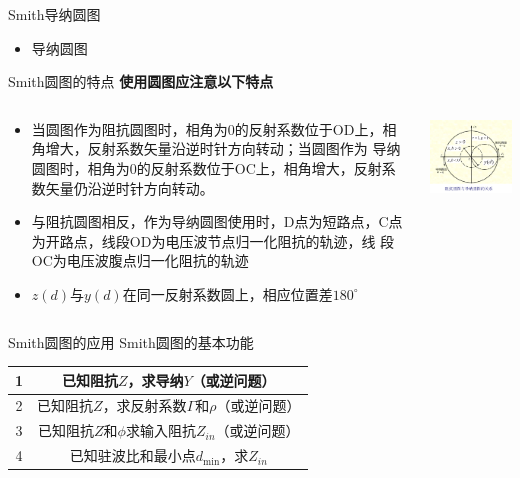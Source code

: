 \begin{frame}{Smith导纳圆图}
  \begin{itemize}
    \item 导纳圆图
  \end{itemize}
\end{frame}

\begin{frame}{Smith圆图的特点}
  \textbf{使用圆图应注意以下特点}\\
  \begin{columns}
    \begin{column}{0.4\linewidth}
      \begin{itemize}
        \item \footnotesize{当圆图作为阻抗圆图时，相角为0的反射系数位于OD上，相角增大，反射系数矢量沿逆时针方向转动；当圆图作为
              导纳圆图时，相角为0的反射系数位于OC上，相角增大，反射系数矢量仍沿逆时针方向转动。}
        \item \footnotesize{与阻抗圆图相反，作为导纳圆图使用时，D点为短路点，C点为开路点，线段OD为电压波节点归一化阻抗的轨迹，线
              段OC为电压波腹点归一化阻抗的轨迹}
        \item \footnotesize{$z(d)$与$y(d)$在同一反射系数圆上，相应位置差$180^{\circ}$}
      \end{itemize}
    \end{column}
    \begin{column}{0.6\linewidth}
      \includegraphics[width=7cm]{Z_Yyuantu.png}
    \end{column}
  \end{columns}
\end{frame}

\begin{frame}{Smith圆图的应用}
  Smith圆图的基本功能
  \begin{center}
    \begin{tabular}{|c|c|}
      \hline
      1 & 已知阻抗$Z$，求导纳$Y$（或逆问题）                  \\
      \hline
      2 & 已知阻抗$Z$，求反射系数$\Gamma$和$\rho$（或逆问题）    \\
      \hline
      3 & 已知阻抗$Z$和$\phi$求输入阻抗$Z_{in}$（或逆问题）     \\
      \hline
      4 & 已知驻波比和最小点$d_{\mathrm{min}}$，求$Z_{in}$ \\
      \hline
    \end{tabular}
  \end{center}
\end{frame}

